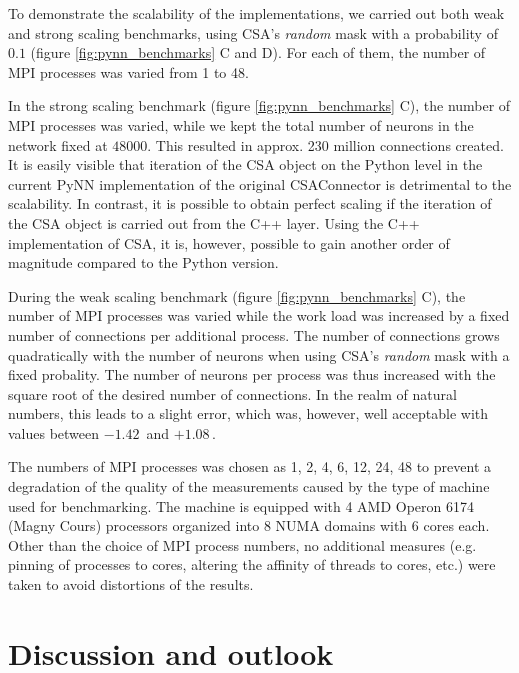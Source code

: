 \documentclass{frontiersSCNS} %
\newcommand{\permil}{\,\textperthousand\xspace}
\begin{document}
To demonstrate the scalability of the implementations, we carried out
both weak and strong scaling benchmarks, using CSA's \emph{random}
mask with a probability of $0.1$ (figure \ref{fig:pynn_benchmarks} C and
D). For each of them, the number of MPI processes was varied from 1 to
48.

In the strong scaling benchmark (figure \ref{fig:pynn_benchmarks} C),
the number of MPI processes was varied, while we kept the total number
of neurons in the network fixed at $48000$. This resulted in
approx. 230 million connections created. It is easily visible that
iteration of the CSA object on the Python level in the current PyNN
implementation of the original CSAConnector is detrimental to the
scalability. In contrast, it is possible to obtain perfect scaling if
the iteration of the CSA object is carried out from the C++
layer. Using the C++ implementation of CSA, it is, however, possible
to gain another order of magnitude compared to the Python version.

During the weak scaling benchmark (figure \ref{fig:pynn_benchmarks}
C), the number of MPI processes was varied while the work load was
increased by a fixed number of connections per additional process.
The number of connections grows quadratically with the number of
neurons when using CSA's \emph{random} mask with a fixed
probality. The number of neurons per process was thus increased with
the square root of the desired number of connections. In the realm of
natural numbers, this leads to a slight error, which was, however,
well acceptable with values between $-1.42$\permil and $+1.08$\permil.

The numbers of MPI processes was chosen as 1, 2, 4, 6, 12, 24, 48 to
prevent a degradation of the quality of the measurements caused by the
type of machine used for benchmarking. The machine is equipped with 4
AMD Operon 6174 (Magny Cours) processors organized into 8 NUMA domains
with 6 cores each. Other than the choice of MPI process numbers, no
additional measures (e.g. pinning of processes to cores, altering the
affinity of threads to cores, etc.) were taken to avoid distortions of
the results.


\section{Discussion and outlook}
\end{document}
